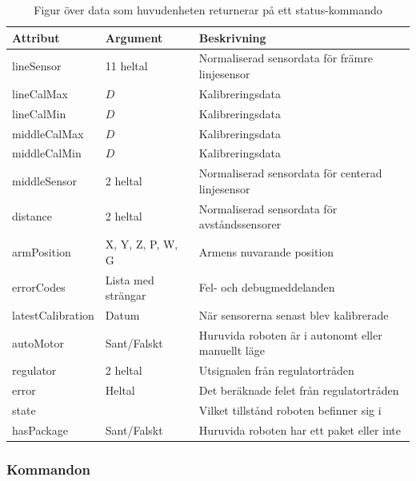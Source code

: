 \begin{table}[h!]
	\centering
	\begin{tabularx}{\textwidth}{| l | X | X |}
		\hline
		\textbf{Attribut} & \textbf{Argument} & {\textbf{Beskrivning}}\\\hline
		{lineSensor} & {11 heltal} & {Normaliserad sensordata för främre linjesensor} \\\hline
		{lineCalMax} & {$D$} & {Kalibreringsdata} \\\hline
		{lineCalMin} & {$D$} & {Kalibreringsdata} \\\hline
		{middleCalMax} & {$D$} & {Kalibreringsdata} \\\hline
		{middleCalMin} & {$D$} & {Kalibreringsdata} \\\hline
		{middleSensor} & {2 heltal} & {Normaliserad sensordata för centerad linjesensor} \\\hline
		{distance} & {2 heltal} & {Normaliserad sensordata för avståndssensorer} \\\hline
		{armPosition} & {X, Y, Z, P, W, G} & {Armens nuvarande position} \\\hline
		{errorCodes} & {Lista med strängar} & {Fel- och debugmeddelanden} \\\hline
		{latestCalibration} & {Datum} & {När sensorerna senast blev kalibrerade} \\\hline
		{autoMotor} & {Sant/Falskt} & {Huruvida roboten är i autonomt eller manuellt läge} \\\hline
		{regulator} & {2 heltal} & {Utsignalen från regulatortråden} \\\hline
		{error} & {Heltal} & {Det beräknade felet från regulatortråden} \\\hline
		{state} & {} & {Vilket tillstånd roboten befinner sig i} \\\hline
		{hasPackage} & {Sant/Falskt} & {Huruvida roboten har ett paket eller inte} \\\hline
	\end{tabularx}
	\caption{Figur över data som huvudenheten returnerar på ett status-kommando} \label{kommunikation-pc-huvud-status}
\end{table}

\subsubsection{Kommandon}

